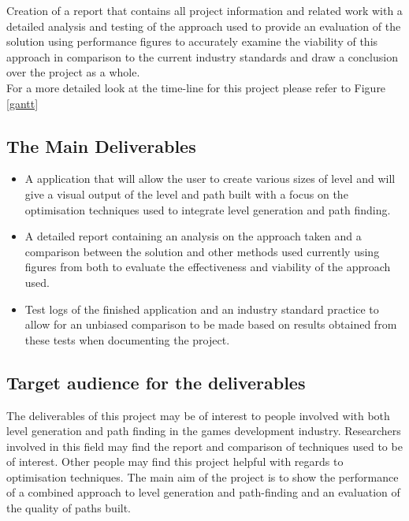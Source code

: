 Creation of a report that contains all project information and related work with a detailed analysis and testing of the approach used to provide an evaluation of the solution using performance figures to accurately examine the viability of this approach in comparison to the current industry standards and draw a conclusion over the project as a whole.\\

For a more detailed look at the time-line for this project please refer to Figure \ref{gantt}\\

\subsection{The Main Deliverables}
\begin{itemize}
\item A application that will allow the user to create various sizes of level and will give a visual output of the level and path built with a focus on the optimisation techniques used to integrate level generation and path finding.\\
\item A detailed report containing an analysis on the approach taken and a comparison between the solution and other methods used currently using figures from both to evaluate the effectiveness and viability of the approach used.\\
\item Test logs of the finished application and an industry standard practice to allow for an unbiased comparison to be made based on results obtained from these tests when documenting the project.
\end{itemize}

\subsection{Target audience for the deliverables}
The deliverables of this project may be of interest to people involved with both level generation and path finding in the games development industry. Researchers involved in this field may find the report and comparison of techniques used to be of interest. Other people may find this project helpful with regards to optimisation techniques. The main aim of the project  is to show the performance of a combined approach to level generation and path-finding and an evaluation of the quality of paths built. 

